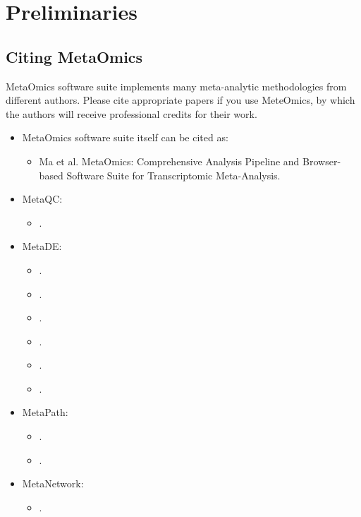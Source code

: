 \section{Preliminaries}
\subsection{Citing MetaOmics}
MetaOmics software suite implements many meta-analytic methodologies from different authors. 
Please cite appropriate papers if you use MeteOmics,
by which the authors will receive professional credits for their work.

\begin{itemize}

\item MetaOmics software suite  itself can be cited as: 

\begin{itemize}
\item Ma et al. MetaOmics: Comprehensive Analysis Pipeline and Browser-based Software Suite for Transcriptomic Meta-Analysis.
\end{itemize}

\item MetaQC: 
\begin{itemize}
\item {}.
\end{itemize}

\item MetaDE: 
\begin{itemize}
\item {}.
\item {}.
\item {}.
\item {}.
\item {}.
\item {}.
\end{itemize}

\item MetaPath: 
\begin{itemize}
\item {}.
\item {}.
\end{itemize}

\item MetaNetwork: 
\begin{itemize}
\item {}.
\end{itemize}


\end{itemize}
